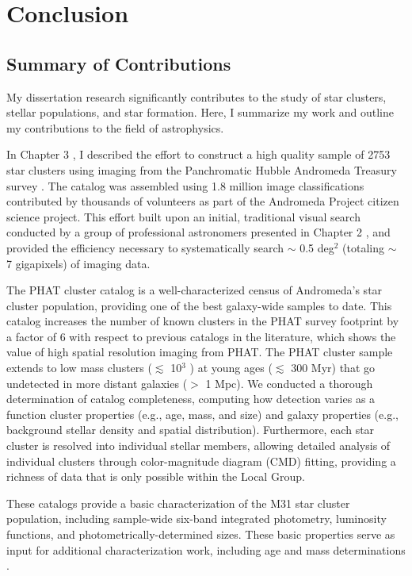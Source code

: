 \chapter{Conclusion}\label{MPSection:1A7D4378-B103-424B-A34F-6C78BF5E5B4D}


\section{Summary of Contributions}\label{MPSection:AAF1D729-E646-4293-AD28-E4B73CE0149D}

My dissertation research significantly contributes to the study of star clusters, stellar populations, and star formation. Here, I summarize my work and outline my contributions to the field of astrophysics.

In Chapter 3 , I described the effort to construct a high quality sample of 2753 star clusters using imaging from the Panchromatic Hubble Andromeda Treasury survey . The catalog was assembled using 1.8 million image classifications contributed by thousands of volunteers as part of the Andromeda Project citizen science project. This effort built upon an initial, traditional visual search conducted by a group of professional astronomers presented in Chapter 2 , and provided the efficiency necessary to systematically search $\sim$ 0.5 deg$^2$ (totaling $\sim$ 7 gigapixels) of imaging data.

The PHAT cluster catalog is a well-characterized census of Andromeda's star cluster population, providing one of the best galaxy-wide samples to date. This catalog increases the number of known clusters in the PHAT survey footprint by a factor of 6 with respect to previous catalogs in the literature, which shows the value of high spatial resolution imaging from PHAT. The PHAT cluster sample extends to low mass clusters ($\lesssim$ 10$^3$ ) at young ages ($\lesssim$ 300 Myr) that go undetected in more distant galaxies ($>$ 1 Mpc). We conducted a thorough determination of catalog completeness, computing how detection varies as a function cluster properties (e.g., age, mass, and size) and galaxy properties (e.g., background stellar density and spatial distribution). Furthermore, each star cluster is resolved into individual stellar members, allowing detailed analysis of individual clusters through color-magnitude diagram (CMD) fitting, providing a richness of data that is only possible within the Local Group.

These catalogs provide a basic characterization of the M31 star cluster population, including sample-wide six-band integrated photometry, luminosity functions, and photometrically-determined sizes. These basic properties serve as input for additional characterization work, including age and mass determinations .

